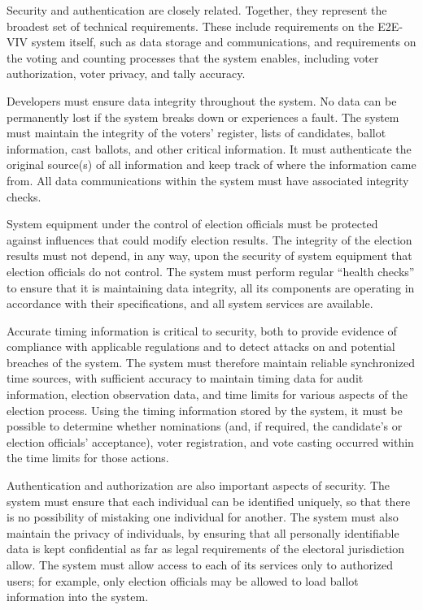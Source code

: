 Security and authentication are closely related. Together, they
represent the broadest set of technical requirements. These include
requirements on the E2E-VIV system itself, such as data storage and
communications, and requirements on the voting and counting processes
that the system enables, including voter authorization, voter privacy,
and tally accuracy.

Developers must ensure data integrity throughout the system.  No data
can be permanently lost if the system breaks down or experiences a
fault. The system must maintain the integrity of the voters' register,
lists of candidates, ballot information, cast ballots, and other
critical information. It must authenticate the original source(s) of
all information and keep track of where the information came from. All
data communications within the system must have associated integrity
checks.

System equipment under the control of election officials must be
protected against influences that could modify election results. The
integrity of the election results must not depend, in any way, upon
the security of system equipment that election officials do not
control. The system must perform regular ``health checks'' to ensure
that it is maintaining data integrity, all its components are
operating in accordance with their specifications, and all system
services are available.

Accurate timing information is critical to security, both to provide
evidence of compliance with applicable regulations and to detect
attacks on and potential breaches of the system. The system must
therefore maintain reliable synchronized time sources, with sufficient
accuracy to maintain timing data for audit information, election
observation data, and time limits for various aspects of the election
process. Using the timing information stored by the system, it must be
possible to determine whether nominations (and, if required, the
candidate's or election officials' acceptance), voter registration,
and vote casting occurred within the time limits for those actions.

Authentication and authorization are also important aspects of
security. The system must ensure that each individual can be
identified uniquely, so that there is no possibility of mistaking one
individual for another. The system must also maintain the privacy of
individuals, by ensuring that all personally identifiable data is kept
confidential as far as legal requirements of the electoral
jurisdiction allow. The system must allow access to each of its
services only to authorized users; for example, only election
officials may be allowed to load ballot information into the system.

